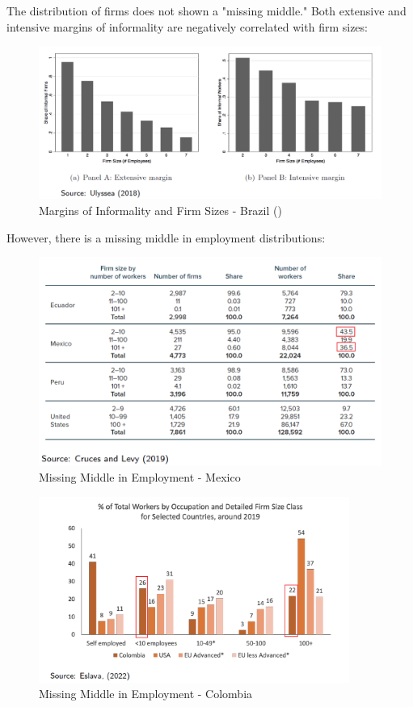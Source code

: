                 The distribution of firms does not shown a "missing middle." Both extensive and intensive margins of informality are negatively correlated with firm sizes:
                \begin{figure}[H]
                    \centering
                    \includegraphics[width=5.5in]{images/ch5/margins of informality and sizes.png}
                    \caption{Margins of Informality and Firm Sizes - Brazil (\cite{ulyssea_firms_2018})}
                \end{figure}
                However, there is a missing middle in employment distributions:
                \begin{figure}[H]
                    \centering
                    \includegraphics[width=5.5in]{images/ch5/missing middle emp 1.png}
                    \caption{Missing Middle in Employment - Mexico}
                \end{figure}
                \begin{figure}[H]
                    \centering
                    \includegraphics[width=4in]{images/ch5/missing middle emp 2.png}
                    \caption{Missing Middle in Employment - Colombia}
                \end{figure}
                
